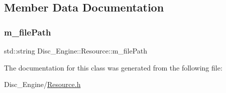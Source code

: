 \subsection{Member Data Documentation}
\mbox{\label{class_disc___engine_1_1_resource_ae1fa22cdaf1982bcbf47adfc2383d831}} 
\subsubsection{\texorpdfstring{m\+\_\+file\+Path}{m\_filePath}}
{\footnotesize\ttfamily std\+::string Disc\+\_\+\+Engine\+::\+Resource\+::m\+\_\+file\+Path\hspace{0.3cm}{\ttfamily [private]}}



The documentation for this class was generated from the following file\+:\begin{DoxyCompactItemize}
\item 
Disc\+\_\+\+Engine/\mbox{\hyperlink{_resource_8h}{Resource.\+h}}\end{DoxyCompactItemize}
